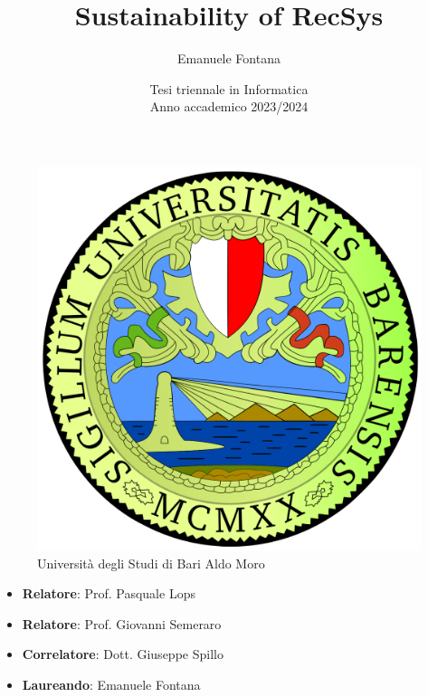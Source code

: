 \documentclass[12pt]{article}
\begin{document}

    \pagestyle{fancy}
    \everymath{\displaystyle}
    \sffamily
    \begin{figure}
        \centering
        \includegraphics[scale=0.1]{images/uniba-logo.png}
        \caption*{Università degli Studi di Bari Aldo Moro}
    \end{figure}
    
    \title{Sustainability of RecSys}
    \author{Emanuele Fontana}
    \date{Tesi triennale in Informatica\\Anno accademico 2023/2024}
    \maketitle

\begin{itemize}
    \item \textbf{Relatore}: Prof. Pasquale Lops
    \item \textbf{Relatore}: Prof. Giovanni Semeraro
    \item \textbf{Correlatore}: Dott. Giuseppe Spillo
    \item \textbf{Laureando}: Emanuele Fontana
\end{itemize}

    \tableofcontents\newpage

    
    \newpage
    
    \newpage
    
    \newpage
    
    
    
    \newpage
    
\end{document}
